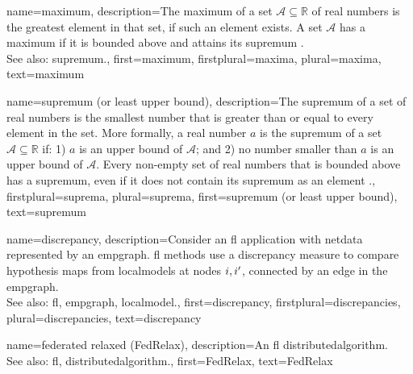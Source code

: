 {name={maximum},
	description={The maximum of a set $\mathcal{A} \subseteq \mathbb{R}$ 
     		of real numbers is the greatest element in that set, if such an element exists. A set $\mathcal{A}$ 
     		has a maximum if it is bounded above and attains its \gls{supremum} \cite[Sec.~1.4]{RudinBookPrinciplesMatheAnalysis}.
				\\ 
		See also: \gls{supremum}.},
 	first={maximum},
 	firstplural={maxima},
 	plural={maxima},
 	text={maximum}
}

{name={supremum (or least upper bound)},
	description={The supremum of a set of real numbers is 
		the smallest number that is greater than or equal to every element in the set. More formally, a 
		real number $a$ is the supremum of a set $\mathcal{A} \subseteq \mathbb{R}$ if: 1) $a$ 
		is an upper bound of $\mathcal{A}$; and 2) no number smaller than $a$ is an upper bound of $\mathcal{A}$. 
		Every non-empty set of real numbers that is bounded above has a supremum, even if it does 
		not contain its supremum as an element \cite[Sec.~1.4]{RudinBookPrinciplesMatheAnalysis}.},
	firstplural={suprema}, 
  	plural={suprema},
	first={supremum (or least upper bound)},
	text={supremum}
}

{name={discrepancy},
	description={Consider an \gls{fl} application with \gls{netdata} 
		represented by an \gls{empgraph}. \gls{fl} methods use a discrepancy measure 
		to compare \gls{hypothesis} \glspl{map} from \glspl{localmodel} at nodes $i,i'$, 
		connected by an edge in the \gls{empgraph}.
					\\ 
		See also: \gls{fl}, \gls{empgraph}, \gls{localmodel}.},
	first={discrepancy},
	firstplural={discrepancies}, 
  	plural={discrepancies}, 
	text={discrepancy}
}

{name={federated relaxed (FedRelax)},
	description={An \gls{fl} \gls{distributedalgorithm}. 
		\\ 
		See also: \gls{fl}, \gls{distributedalgorithm}.},
	first={FedRelax},
	text={FedRelax}
} 

